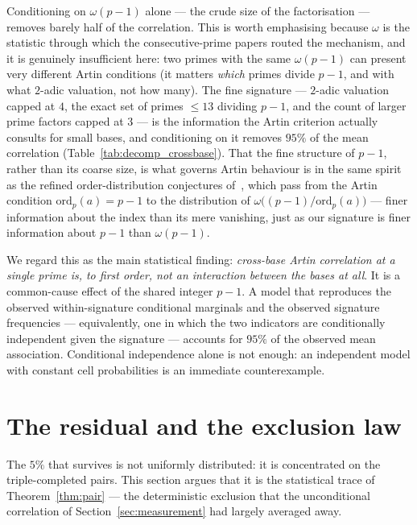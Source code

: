\documentclass[11pt,reqno]{amsart}
\theoremstyle{plain}
\theoremstyle{definition}
\begin{document}
Conditioning on $\omega(p-1)$ alone --- the crude size of the factorisation
--- removes barely half of the correlation. This is worth emphasising because
$\omega$ is the statistic through which the consecutive-prime papers routed
the mechanism, and it is genuinely insufficient here: two primes with the same
$\omega(p-1)$ can present very different Artin conditions (it matters
\emph{which} primes divide $p-1$, and with what $2$-adic valuation, not how
many). The fine signature --- $2$-adic valuation capped at $4$, the exact set
of primes $\le 13$ dividing $p - 1$, and the count of larger prime factors
capped at $3$ --- is the information the Artin criterion actually consults
for small bases, and conditioning on it removes $95\%$ of the mean
correlation (Table~\ref{tab:decomp_crossbase}). That the fine structure of $p-1$, rather
than its coarse size, is what governs Artin behaviour is in the same spirit as
the refined order-distribution conjectures
of~\cite{GoldmakherMartinPeringuey2025}, which pass from the Artin condition
$\mathrm{ord}_p(a) = p-1$ to the distribution of
$\omega\bigl((p-1)/\mathrm{ord}_p(a)\bigr)$ --- finer information about the
index than its mere vanishing, just as our signature is finer information about
$p-1$ than $\omega(p-1)$.

We regard this as the main statistical finding: \emph{cross-base Artin
correlation at a single prime is, to first order, not an interaction between
the bases at all}. It is a common-cause effect of the shared integer $p - 1$.
A model that reproduces the observed within-signature conditional marginals
and the observed signature frequencies --- equivalently, one in which the two
indicators are conditionally independent given the signature --- accounts for
$95\%$ of the observed mean association. Conditional independence alone is not
enough: an independent model with constant cell probabilities is an immediate
counterexample.




\section{The residual and the exclusion law}
\label{sec:entanglement}

The $5\%$ that survives is not uniformly distributed: it is concentrated on the triple-completed pairs. This section argues that it is the statistical trace of Theorem~\ref{thm:pair} --- the
deterministic exclusion that the unconditional correlation of
Section~\ref{sec:measurement} had largely averaged away.
\end{document}
